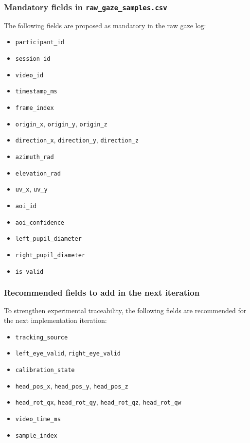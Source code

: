 \documentclass[11pt]{article}
\begin{document}
\subsubsection{Mandatory fields in \texttt{raw\_gaze\_samples.csv}}

The following fields are proposed as mandatory in the raw gaze log:

\begin{itemize}
    \item \texttt{participant\_id}
    \item \texttt{session\_id}
    \item \texttt{video\_id}
    \item \texttt{timestamp\_ms}
    \item \texttt{frame\_index}
    \item \texttt{origin\_x}, \texttt{origin\_y}, \texttt{origin\_z}
    \item \texttt{direction\_x}, \texttt{direction\_y}, \texttt{direction\_z}
    \item \texttt{azimuth\_rad}
    \item \texttt{elevation\_rad}
    \item \texttt{uv\_x}, \texttt{uv\_y}
    \item \texttt{aoi\_id}
    \item \texttt{aoi\_confidence}
    \item \texttt{left\_pupil\_diameter}
    \item \texttt{right\_pupil\_diameter}
    \item \texttt{is\_valid}
\end{itemize}

\subsubsection{Recommended fields to add in the next iteration}

To strengthen experimental traceability, the following fields are recommended for the next implementation iteration:

\begin{itemize}
    \item \texttt{tracking\_source}
    \item \texttt{left\_eye\_valid}, \texttt{right\_eye\_valid}
    \item \texttt{calibration\_state}
    \item \texttt{head\_pos\_x}, \texttt{head\_pos\_y}, \texttt{head\_pos\_z}
    \item \texttt{head\_rot\_qx}, \texttt{head\_rot\_qy}, \texttt{head\_rot\_qz}, \texttt{head\_rot\_qw}
    \item \texttt{video\_time\_ms}
    \item \texttt{sample\_index}
\end{itemize}
\end{document}
